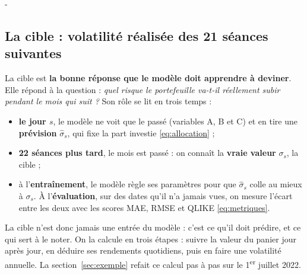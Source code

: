 \documentclass[10pt,a4paper]{article}
\makeatletter
\newcommand{\besoin}[1]{\par\penalty-100\begingroup\setlength{\dimen@}{#1}%
  \dimen@ii\pagegoal\advance\dimen@ii-\pagetotal
  \ifdim\dimen@>\dimen@ii\ifdim\dimen@ii>\z@\vfil\fi\break\fi\endgroup}
\let\soussectionorigine\subsection
\renewcommand{\subsection}{\besoin{5\baselineskip}\soussectionorigine}
\makeatother
\begin{document}
\subsection{La cible : volatilité réalisée des 21 séances suivantes}
La cible est \textbf{la bonne réponse que le modèle doit apprendre à deviner}. Elle répond à la question : \emph{quel risque le portefeuille va-t-il réellement subir pendant le mois qui suit ?} Son rôle se lit en trois temps :
\begin{itemize}[nosep,leftmargin=*]
  \item \textbf{le jour $s$}, le modèle ne voit que le passé (variables A, B et C) et en tire une \textbf{prévision} $\widehat\sigma_s$, qui fixe la part investie \eqref{eq:allocation} ;
  \item \textbf{22 séances plus tard}, le mois est passé : on connaît la \textbf{vraie valeur} $\sigma_s$, la cible ;
  \item à l'\textbf{entraînement}, le modèle règle ses paramètres pour que $\widehat\sigma_s$ colle au mieux à $\sigma_s$. À l'\textbf{évaluation}, sur des dates qu'il n'a jamais vues, on mesure l'écart entre les deux avec les scores MAE, RMSE et QLIKE \eqref{eq:metriques}.
\end{itemize}
La cible n'est donc jamais une entrée du modèle : c'est ce qu'il doit prédire, et ce qui sert à le noter. On la calcule en trois étapes : suivre la valeur du panier jour après jour, en déduire ses rendements quotidiens, puis en faire une volatilité annuelle. La section~\ref{sec:exemple} refait ce calcul pas à pas sur le 1\textsuperscript{er} juillet 2022.
\end{document}
